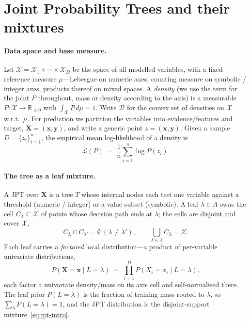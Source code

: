 \documentclass[11pt]{article}
\theoremstyle{plain}
\theoremstyle{definition}
\theoremstyle{remark}
\newcommand{\R}{\mathbb{R}}
\newcommand{\Xsp}{\mathcal{X}}
\newcommand{\Dens}{\mathcal{D}}
\newcommand{\Leafset}{\Lambda}
\begin{document}
\section{Joint Probability Trees and their mixtures}
\label{sec:jpt}

\paragraph{Data space and base measure.}
Let $\Xsp=\Xsp_1\times\cdots\times\Xsp_D$ be the space of all modelled
variables, with a fixed reference measure $\mu$---Lebesgue on numeric axes,
counting measure on symbolic / integer axes, products thereof on mixed
spaces. A \emph{density} (we use the term for the joint $P$ throughout,
mass or density according to the axis) is a measurable
$P:\Xsp\to\R_{\ge 0}$ with $\int_\Xsp P\, d\mu = 1$. Write $\Dens$ for the
convex set of densities on $\Xsp$ w.r.t.\ $\mu$. For prediction we
partition the variables into evidence/features and target,
$\mathbf{X}=(\mathbf{x},\mathbf{y})$, and write a generic point $z=
(\mathbf{x},\mathbf{y})$. Given a sample $D=\{z_i\}_{i=1}^n$, the empirical
mean log-likelihood of a density is
\begin{equation}
\label{eq:LL}
\mathcal{L}(P)\;=\;\frac{1}{n}\sum_{i=1}^n \log P(z_i).
\end{equation}

\paragraph{The tree as a leaf mixture.}
A JPT over $\mathbf{X}$ is a tree $T$ whose internal nodes each test one
variable against a threshold (numeric / integer) or a value subset
(symbolic). A leaf $\lambda\in\Leafset$ owns the cell
$C_\lambda\subseteq\Xsp$ of points whose decision path ends at $\lambda$;
the cells are disjoint and cover $\Xsp$,
\[
C_\lambda \cap C_{\lambda'} = \emptyset \ (\lambda\neq\lambda'),
\qquad \bigcup_{\lambda\in\Leafset} C_\lambda = \Xsp .
\]
Each leaf carries a \emph{factored} local distribution---a product of
per-variable univariate distributions,
\begin{equation}
\label{eq:leaf}
P(\mathbf{X}=\mathbf{x}\mid L=\lambda)\;=\;
\prod_{i=1}^{D} P(X_i=x_i\mid L=\lambda),
\end{equation}
each factor a univariate density/mass on its axis cell and self-normalised
there. The leaf prior $P(L=\lambda)$ is the fraction of training mass
routed to $\lambda$, so $\sum_\lambda P(L=\lambda)=1$, and the JPT
distribution is the disjoint-support mixture~\eqref{eq:jpt-intro}.
\end{document}
